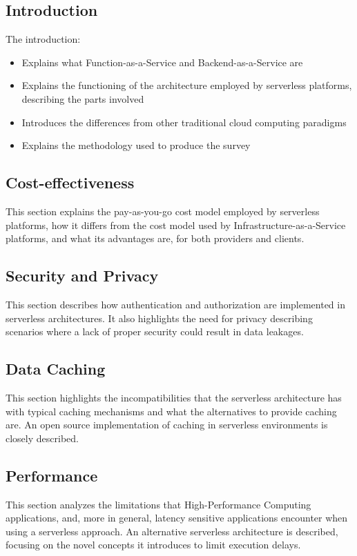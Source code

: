 \documentclass{scrartcl}
\begin{document}
\subsection{Introduction}
The introduction:
\begin{itemize}
  \item Explains what Function-as-a-Service and Backend-as-a-Service are
  \item Explains the functioning of the architecture employed by serverless platforms, describing the parts involved
  \item Introduces the differences from other traditional cloud computing paradigms
  \item Explains the methodology used to produce the survey
\end{itemize}

\subsection{Cost-effectiveness}
This section explains the pay-as-you-go cost model employed by serverless platforms, how it differs from the cost model used by Infrastructure-as-a-Service platforms, and what its advantages are, for both providers and clients.

\subsection{Security and Privacy}
This section describes how authentication and authorization are implemented in serverless architectures. It also highlights the need for privacy describing scenarios where a lack of proper security could result in data leakages.

\subsection{Data Caching}
This section highlights the incompatibilities that the serverless architecture has with typical caching mechanisms and what the alternatives to provide caching are. An open source implementation of caching in serverless environments is closely described.

\subsection{Performance}
This section analyzes the limitations that High-Performance Computing applications, and, more in general, latency sensitive applications encounter when using a serverless approach. An alternative serverless architecture is described, focusing on the novel concepts it introduces to limit execution delays.
\end{document}

